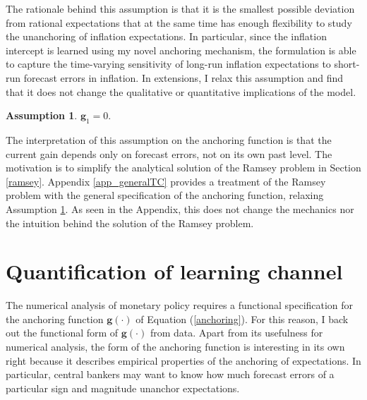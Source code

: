 \documentclass[11pt]{article}
\renewcommand{\[}{\begin{equation}}
\renewcommand{\]}{\end{equation}}
\newtheorem{ass}{Assumption}
\begin{document}
The rationale behind this assumption is that it is the smallest possible deviation from rational expectations that at the same time has enough flexibility to study the unanchoring of inflation expectations. In particular, since the inflation intercept is learned using my novel anchoring mechanism, the formulation is able to capture the time-varying sensitivity of long-run inflation expectations to short-run forecast errors in inflation. In extensions, I relax this assumption and find that it does not change the qualitative or quantitative implications of the model. 


\begin{ass}{$\mathbf{g}_1 = 0.$}\label{ass_glevels}
\end{ass}
The interpretation of this assumption on the anchoring function is that the current gain depends only on forecast errors, not on its own past level. The motivation is to simplify the analytical solution of the Ramsey problem in Section \ref{ramsey}. Appendix \ref{app_generalTC} provides a treatment of the Ramsey problem with the general specification of the anchoring function, relaxing Assumption \ref{ass_glevels}. As seen in the Appendix, this does not change the mechanics nor the intuition behind the solution of the Ramsey problem. 


\section{Quantification of learning channel}\label{estimation}
The numerical analysis of monetary policy requires a functional specification for the anchoring function $\mathbf{g}(\cdot)$ of Equation (\ref{anchoring}). For this reason, I back out the functional form of $\mathbf{g}(\cdot)$ from data. Apart from its usefulness for numerical analysis, the form of the anchoring function is interesting in its own right because it describes empirical properties of the anchoring of expectations. In particular, central bankers may want to know how much forecast errors of a particular sign and magnitude unanchor expectations. 
\end{document}
